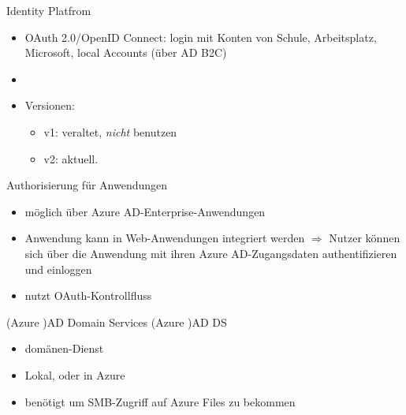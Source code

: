 \begin{flashcard}[Definition]{Identity Platfrom}
  \begin{itemize}
    \item OAuth 2.0/OpenID Connect: login mit Konten von Schule, Arbeitsplatz, Microsoft, local Accounts (über AD B2C)
    \item
    \item Versionen:
      \begin{itemize}
        \item v1: veraltet, \emph{nicht} benutzen
        \item v2: aktuell.
      \end{itemize}

  \end{itemize}
\end{flashcard}



\begin{flashcard}[Definition]{Authorisierung für Anwendungen}
  \begin{itemize}
    \item möglich über Azure AD-Enterprise-Anwendungen
    \item Anwendung kann in Web-Anwendungen integriert werden\newline
      $\Rightarrow$ Nutzer können sich über die Anwendung mit ihren Azure AD-Zugangsdaten authentifizieren und einloggen
    \item nutzt OAuth-Kontrollfluss
  \end{itemize}
\end{flashcard}

\begin{flashcard}[Definition]{(Azure )AD Domain Services}
  (Azure )AD DS
  \begin{itemize}
    \item domänen-Dienst
    \item Lokal, oder in Azure
    \item benötigt um SMB-Zugriff auf Azure Files zu bekommen
  \end{itemize}
\end{flashcard}

